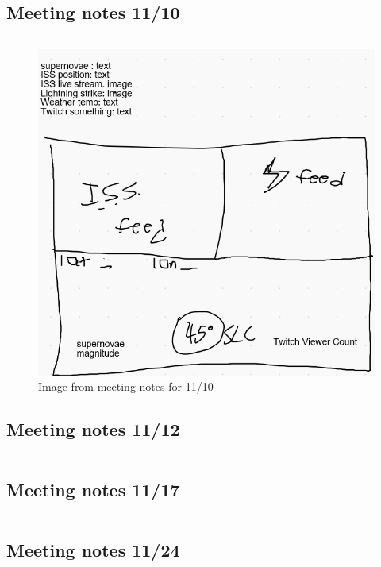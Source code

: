 \documentclass{article}
\begin{document}
\subsection{Meeting notes 11/10}
\inputminted[breaklines=true, linenos=true]{text}{../meeting_notes/meeting_notes_11_10.txt}
\begin{figure}[H]
  \includegraphics[width=\linewidth]{../meeting_notes/meeting_notes_image_11_10.png}
  \caption{Image from meeting notes for 11/10}
\end{figure}

\subsection{Meeting notes 11/12}
\inputminted[breaklines=true, linenos=true]{text}{../meeting_notes/meeting_notes_11_12.txt}

\subsection{Meeting notes 11/17}
\inputminted[breaklines=true, linenos=true]{text}{../meeting_notes/meeting_notes_11_17.txt}

\subsection{Meeting notes 11/24}
\inputminted[breaklines=true, linenos=true]{text}{../meeting_notes/meeting_notes_11_24.txt}
\end{document}
